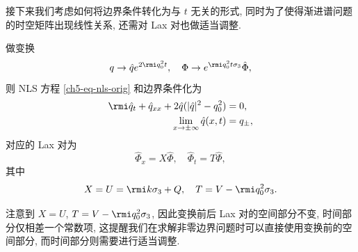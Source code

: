 接下来我们考虑如何将边界条件转化为与 $ t $ 无关的形式, 同时为了使得渐进谱问题的时空矩阵出现线性关系, 还需对 Lax 对也做适当调整.
\begin{proposition}
    做变换
    \begin{equation}
        q \to \hat{q} e^{2 \rmi q_{0}^2 t}, \quad \Phi \to e^{\rmi q_{0}^{2} t \sigma_{3}} \hat{\Phi},
    \end{equation}
    则 NLS 方程 \eqref{ch5-eq-nls-orig} 和边界条件化为
    \begin{align}
        \rmi \hat{q}_{t} + \hat{q}_{xx} + 2 \hat{q} (|\hat{q}|^{2}-q_{0}^{2}) & = 0, \label{ch5-eq-nls-gauge}      \\
        \lim_{x \to \pm \infty} \hat{q}(x,t)                                  & = q_{\pm}, \label{ch5-eq-bc-gauge}
    \end{align}
    对应的 Lax 对为
    \begin{equation}
        \hat{\Phi}_{x} = X \hat{\Phi}, \quad \hat{\Phi}_{t} = T \hat{\Phi}, \label{ch5-eq-lax-gauge}
    \end{equation}
    其中
    \begin{equation}
        X = U = \rmi k \sigma_{3} + Q, \quad T = V - \rmi q_{0}^{2} \sigma_{3}.
    \end{equation}
\end{proposition}
\begin{remark}
    注意到 $ X = U $, $ T = V - \rmi q_{0}^{2} \sigma_{3} $, 因此变换前后 Lax 对的空间部分不变, 时间部分仅相差一个常数项, 这提醒我们在求解非零边界问题时可以直接使用变换前的空间部分, 而时间部分则需要进行适当调整.
\end{remark}
